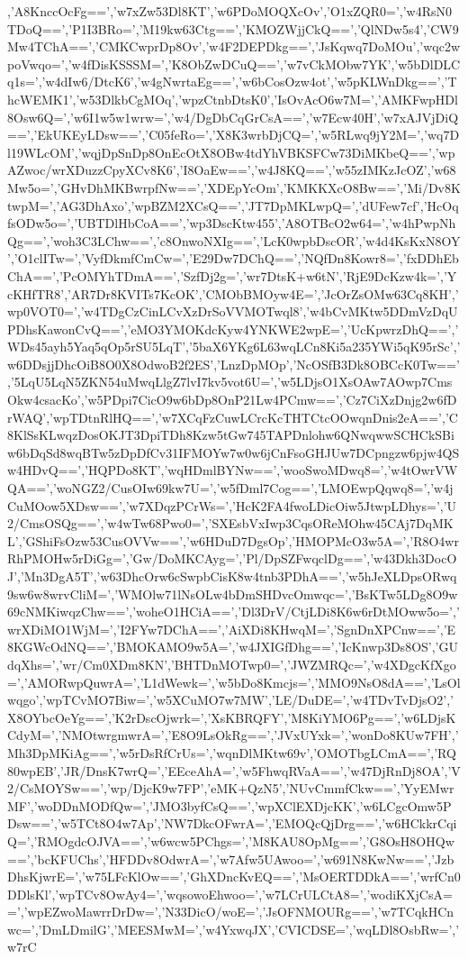 {,'A8KnccOcFg==','w7xZw53Dl8KT','w6PDoMOQXcOv','O1xZQR0=','w4RsN0TDoQ==','P1I3BRo=','M19kw63Ctg==','KMOZWjjCkQ==','QlNDw5s4','CW9Mw4TChA==','CMKCwprDp8Ov','w4F2DEPDkg==','JsKqwq7DoMOu','wqc2wpoVwqo=','w4fDisKSSSM=','K8ObZwDCuQ==','w7vCkMObw7YK','w5bDlDLCq1s=','w4dIw6/DtcK6','w4gNwrtaEg==','w6bCosOzw4ot','w5pKLWnDkg==','ThcWEMK1','w53DlkbCgMOq','wpzCtnbDtsK0','IsOvAcO6w7M=','AMKFwpHDl8Osw6Q=','w6I1w5w1wrw=','w4/DgDbCqGrCsA==','w7Ecw40H','w7xAJVjDiQ==','EkUKEyLDsw==','C05feRo=','X8K3wrbDjCQ=','w5RLwq9jY2M=','wq7Dl19WLcOM','wqjDpSnDp8OnEcOtX8OBw4tdYhVBKSFCw73DiMKbeQ==','wpAZwoc/wrXDuzzCpyXCv8K6','I8OaEw==','w4J8KQ==','w55zIMKzJcOZ','w68Mw5o=','GHvDhMKBwrpfNw==','XDEpYcOm','KMKKXcO8Bw==','Mi/Dv8KtwpM=','AG3DhAxo','wpBZM2XCsQ==','JT7DpMKLwpQ=','dUFew7cf','HcOqfsODw5o=','UBTDlHbCoA==','wp3DscKtw455','A8OTBcO2w64=','w4hPwpNhQg==','woh3C3LChw==','c8OnwoNXIg==','LcK0wpbDscOR','w4d4KsKxN8OY','O1clITw=','VyfDkmfCmCw=','E29Dw7DChQ==','NQfDn8Kowr8=','fxDDhEbChA==','PcOMYhTDmA==','SzfDj2g=','wr7DtsK+w6tN','RjE9DcKzw4k=','YcKHfTR8','AR7Dr8KVITs7KcOK','CMObBMOyw4E=','JcOrZsOMw63Cq8KH','wp0VOT0=','w4TDgCzCinLCvXzDrSoVVMOTwql8','w4bCvMKtw5DDmVzDqUPDhsKawonCvQ==','eMO3YMOKdcKyw4YNKWE2wpE=','UcKpwrzDhQ==','WDs45ayh5Yaq5qOp5rSU5LqT','5baX6YKg6L63wqLCn8Ki5a235YWi5qK95rSc','w6DDsjjDhcOiB8O0X8OdwoB2f2ES','LnzDpMOp','NcOSfB3Dk8OBCcK0Tw==','5LqU5LqN5ZKN54uMwqLlgZ7lvI7kv5vot6U=','w5LDjsO1XsOAw7AOwp7CmsOkw4csacKo','w5PDpi7CicO9w6bDp8OnP21Lw4PCmw==','Cz7CiXzDnjg2w6fDrWAQ','wpTDtnRlHQ==','w7XCqFzCuwLCrcKcTHTCtcOOwqnDnis2eA==','C8KlSsKLwqzDosOKJT3DpiTDh8Kzw5tGw745TAPDnlohw6QNwqwwSCHCkSBiw6bDqSd8wqBTw5zDpDfCv31IFMOYw7w0w6jCnFsoGHJUw7DCpngzw6pjw4QSw4HDvQ==','HQPDo8KT','wqHDmlBYNw==','wooSwoMDwq8=','w4tOwrVWQA==','woNGZ2/CusOIw69kw7U=','w5fDml7Cog==','LMOEwpQqwq8=','w4jCuMOow5XDsw==','w7XDqzPCrWs=','HcK2FA4fwoLDicOiw5JtwpLDhys=','U2/CmsOSQg==','w4wTw68Pwo0=','SXEsbVxIwp3CqsOReMOhw45CAj7DqMKL','GShiFsOzw53CusOVVw==','w6HDuD7DgsOp','HMOPMcO3w5A=','R8O4wrRhPMOHw5rDiGg=','Gw/DoMKCAyg=','Pl/DpSZFwqclDg==','w43Dkh3DocOJ','Mn3DgA5T','w63DhcOrw6cSwpbCisK8w4tnb3PDhA==','w5hJeXLDpsORwq9sw6w8wrvCliM=','WMOlw71lNsOLw4bDmSHDvcOmwqc=','BsKTw5LDg8O9w69cNMKiwqzChw==','woheO1HCiA==','Dl3DrV/CtjLDi8K6w6rDtMOww5o=','wrXDiMO1WjM=','I2FYw7DChA==','AiXDi8KHwqM=','SgnDnXPCnw==','E8KGWcOdNQ==','BMOKAMO9w5A=','w4JXIGfDhg==','IcKnwp3Ds8OS','GUdqXhs=','wr/Cm0XDm8KN','BHTDnMOTwp0=','JWZMRQc=','w4XDgcKfXgo=','AMORwpQuwrA=','L1dWewk=','w5bDo8Kmcjs=','MMO9NsO8dA==','LsOlwqgo','wpTCvMO7Biw=','w5XCuMO7w7MW','LE/DuDE=','w4TDvTvDjsO2','X8OYbcOeYg==','K2rDscOjwrk=','XsKBRQFY','M8KiYMO6Pg==','w6LDjsKCdyM=','NMOtwrgmwrA=','E8O9LsOkRg==','JVxUYxk=','wonDo8KUw7FH','Mh3DpMKiAg==','w5rDsRfCrUs=','wqnDlMKtw69v','OMOTbgLCmA==','RQ80wpEB','JR/DnsK7wrQ=','EEceAhA=','w5FhwqRVaA==','w47DjRnDj8OA','V2/CsMOYSw==','wp/DjcK9w7FP','eMK+QzN5','NUvCmmfCkw==','YyEMwrMF','woDDnMODfQw=','JMO3byfCsQ==','wpXClEXDjcKK','w6LCgcOmw5PDsw==','w5TCt8O4w7Ap','NW7DkcOFwrA=','EMOQcQjDrg==','w6HCkkrCqiQ=','RMOgdcOJVA==','w6wcw5PChgs=','M8KAU8OpMg==','G8OsH8OHQw==','bcKFUChs','HFDDv8OdwrA=','w7Afw5UAwoo=','w691N8KwNw==','JzbDhsKjwrE=','w75LFcKlOw==','GhXDncKvEQ==','MsOERTDDkA==','wrfCn0DDlsKl','wpTCv8OwAy4=','wqsowoEhwoo=','w7LCrULCtA8=','wodiKXjCsA==','wpEZwoMawrrDrDw=','N33DicO/woE=','JsOFNMOURg==','w7TCqkHCnwc=','DmLDmilG','MEESMwM=','w4YxwqJX','CVICDSE=','wqLDl8OsbRw=','w7rC}
